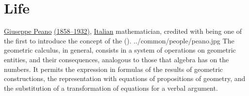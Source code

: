 ﻿%





\chapter{Life}
\qboxnpq
  {\href{http://en.wikipedia.org/wiki/Giuseppe_Peano}{Giuseppe Peano}
   \href{http://www-history.mcs.st-andrews.ac.uk/Timelines/TimelineF.html}{(1858--1932)},
   \href{http://www-history.mcs.st-andrews.ac.uk/BirthplaceMaps/Places/Italy.html}{Italian} mathematician,
   credited with being one of the first to introduce the concept of the  ().}
  {../common/people/peano.jpg}
  {The geometric calculus, in general, 
   consists in a system of operations on geometric entities, and their consequences, 
   analogous to those that algebra has on the numbers.
   It permits the expression in formulas of the results of geometric constructions,
   the representation with equations of propositions of geometry,
   and the substitution of a transformation of equations for a verbal argument.}


